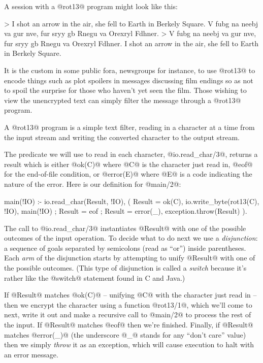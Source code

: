 A session with a @rot13@ program might look like this:
\begin{myverbatim}
> I shot an arrow in the air, she fell to Earth in Berkely Square.
V fubg na neebj va gur nve, fur sryy gb Rnegu va Orexryl Fdhner.
> V fubg na neebj va gur nve, fur sryy gb Rnegu va Orexryl Fdhner.
I shot an arrow in the air, she fell to Earth in Berkely Square.
\end{myverbatim}

It is the custom in some public fora, newsgroups for instance, to use
@rot13@ to encode things such as plot spoilers in messages discussing film
endings so as not to spoil the surprise for those who haven't yet seen the
film.  Those wishing to view the unencrypted text can simply filter the
message through a @rot13@ program.

A @rot13@ program is a simple text filter, reading in a character at a time
from the input stream and writing the converted character to the output
stream.

The predicate we will use to read in each character, @io.read_char/3@,
returns a result which is either @ok(C)@ where @C@ is the character just
read in, @eof@ for the end-of-file condition, or @error(E)@ where @E@ is a
code indicating the nature of the error.  Here is our definition for
@main/2@:
\begin{myverbatim}
main(!IO) :-
    io.read_char(Result, !IO),
    (
        Result = ok(C),
        io.write_byte(rot13(C), !IO),
        main(!IO)
    ;
        Result = eof
    ;
        Result = error(_),
        exception.throw(Result)
    ).
\end{myverbatim}
The call to @io.read_char/3@ instantiates @Result@ with one of the
possible outcomes of the input operation.  To decide what to do next we
use a \emph{disjunction}: a sequence of goals separated by
semicolons (read as ``or'') inside parentheses.  Each
\emph{arm} of the disjunction starts by attempting to unify @Result@
with one of the possible outcomes.  (This type of disjunction is called a
\emph{switch} because it's rather like the @switch@ statement found in C and
Java.)

If @Result@ matches @ok(C)@ -- unifying @C@ with the character just read
in -- then we encrypt the character using a function @rot13/1@, which we'll
come to next, write it out and make a recursive call to @main/2@ to process
the rest of the input.  If @Result@ matches @eof@ then we're finished.
Finally, if @Result@ matches @error(_)@ (the underscore @_@ stands for any
``don't care'' value) then we simply \emph{throw} it as an exception, which
will cause execution to halt with an error message.

